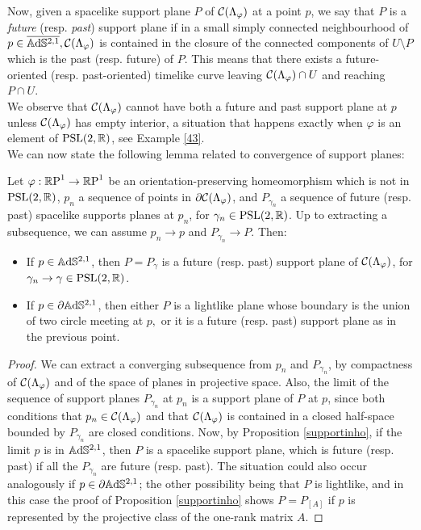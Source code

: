 Now, given a spacelike support plane $P$ of $\CF$ at a point $p$, we say that $P$ is a \textit{future} (resp. \textit{past}) support plane if in a small simply connected neighbourhood of $p\in\overline{\A^{2,1}}, \CF$ is contained in the closure of the connected components of $U\setminus P$ which is the past (resp. future) of $P$. This means that there exists a future-oriented (resp. past-oriented) timelike curve leaving $\CF\cap U$ and reaching $P\cap U$. \\
We observe that $\CF$ cannot have both a future and past support plane at $p$ unless $\CF$ has empty interior, a situation that happens exactly when $\varphi$ is an element of $\PSL$, see Example \ref{43}.\\
We can now state the following lemma related to convergence of support planes: 
\begin{lemma}\label{49}
    Let $\varphi:\S\to\S$ be an orientation-preserving homeomorphism which is not in $\PSL$, $p_n$ a sequence of points in $\partial\CF$, and $P_{\gamma_n}$ a sequence of future (resp. past) spacelike supports planes at $p_n$, for $\gamma_n\in\PSL$. Up to extracting a subsequence, we can assume $p_n\to p$ and $P_{\gamma_n}\to P.$ Then: 
    \begin{itemize}
        \item If $p\in\A^{2,1}$, then $P=P_\gamma$ is a future (resp. past) support plane of $\CF$, for $\gamma_n\to\gamma\in\PSL$.
        \item If $p\in\partial\A^{2,1}$, then either $P$ is a lightlike plane whose boundary is the union of two circle meeting at $p,$ or it is a future (resp. past) support plane as in the previous point.        
    \end{itemize}
\end{lemma}
\begin{proof}
We can extract a converging subsequence from $p_{n}$ and $P_{\gamma_n}$, by compactness of $\CF$ and of the space of planes in projective space. Also, the limit of the sequence of support planes $P_{\gamma_n}$ at $p_n$ is a support plane of $P$ at $p$, since both conditions that $p_n\in\CF$ and that $\CF$ is contained in a closed half-space bounded by $P_{\gamma_n}$ are closed conditions. Now, by Proposition \ref{supportinho}, if the limit $p$ is in $\A^{2,1}$, then $P$ is a spacelike support plane, which is future (resp. past) if all the $P_{\gamma_n}$ are future (resp. past). The situation could also occur analogously if $p\in\partial\A^{2,1}$; the other possibility being that $P$ is lightlike, and in this case the proof of Proposition \ref{supportinho} shows $P=P_{[A]}$ if $p$ is represented by the projective class of the one-rank matrix $A$.
\end{proof}
